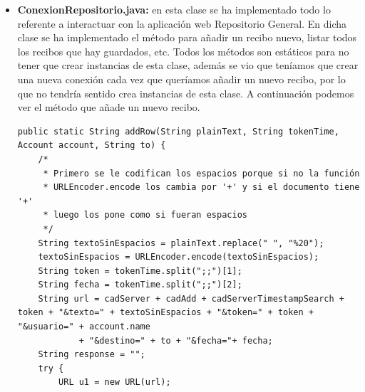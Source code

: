 \begin{itemize}
\begin{lstlisting}[style=Java]
// Para que cuando cambie el texto lo cambie también en el título...
textPath.setOnPreferenceChangeListener(new OnPreferenceChangeListener() {
	public boolean onPreferenceChange(Preference preference, Object newValue) {
		EditTextPreference textPath = (EditTextPreference) preference;
		String s = (String) newValue;

		String pass = settings.getString("certificate_password", "NotValue");
		if (!pass.equals("NotValue")) {
			boolean check = AuxiliaryFunction.checkCert(s, pass);

			if (check) {
				textPath.setSummary(s);
				textPath.setText(s);
				Editor editor = settings.edit();
				editor.putString("path_certificate", s);
				editor.commit();
				return true;
			} else {
				textPath.setSummary("No se ha podido cargar el certificado,\nla ruta no es correcta");
				return true;
			}
		} else {
			textPath.setSummary("Password no guardado");
			return true;
		}

	}

});
\end{lstlisting}

Creamos la variable EditTextPreference donde mostraremos el password del certificado que estamos usando para firmar el texto. A continuación implementamos el listener \lstinline{OnPreferenceChangeListener}, el cual se activará cuando cambiemos el password del certificado. Podemos observar que cuando introducimos un nuevo password hacemos una comprobación para ver si después del cambio podemos seguir usando dicho certificado, si no es posible informamos al usuario mostrando un mensaje en el que se le indicará que no se ha guardado el password.

\item \textbf{ConexionRepositorio.java:} en esta clase se ha implementado todo lo referente a interactuar con la aplicación web Repositorio General. En dicha clase se ha implementado el método para añadir un recibo nuevo, listar todos los recibos que hay guardados, etc. Todos los métodos son estáticos para no tener que crear instancias de esta clase, además se vio que teníamos que crear una nueva conexión cada vez que queríamos añadir un nuevo recibo, por lo que no tendría sentido crea instancias de esta clase. A continuación podemos ver el método que añade un nuevo recibo.

\begin{lstlisting}[style=Java]
public static String addRow(String plainText, String tokenTime, Account account, String to) {
	/*
	 * Primero se le codifican los espacios porque si no la función
	 * URLEncoder.encode los cambia por '+' y si el documento tiene '+'
	 * luego los pone como si fueran espacios
	 */
	String textoSinEspacios = plainText.replace(" ", "%20");
	textoSinEspacios = URLEncoder.encode(textoSinEspacios);
	String token = tokenTime.split(";;")[1];
	String fecha = tokenTime.split(";;")[2];
	String url = cadServer + cadAdd + cadServerTimestampSearch + token + "&texto=" + textoSinEspacios + "&token=" + token + "&usuario=" + account.name
			+ "&destino=" + to + "&fecha="+ fecha;
	String response = "";
	try {
		URL u1 = new URL(url);


\end{lstlisting}
\end{itemize}
